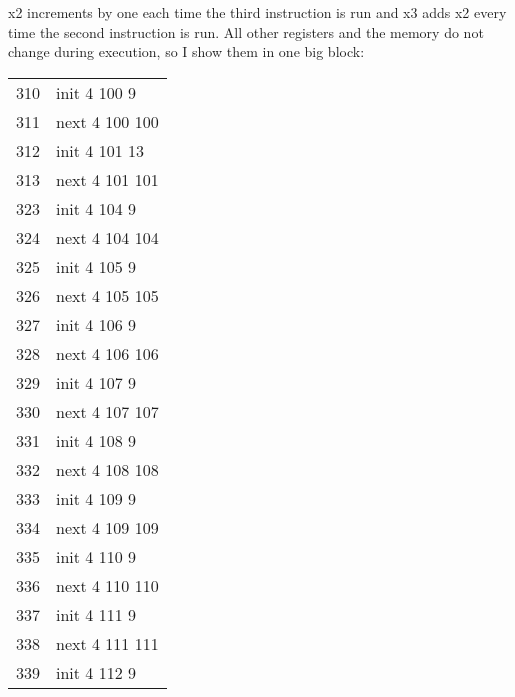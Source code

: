 x2 increments by one each time the third instruction is run and x3
adds x2 every time the second instruction is run. All other registers
and the memory do not change during execution, so I show them in one
big block:
\begin{center}
    \begin{tabular}[h!]{>{\ttfamily\color{UniRed}}r >{\ttfamily}l }
        310 & init \color{UniGrey} 4 \color{UniRed} 100 9   \\
        311 & next \color{UniGrey} 4 \color{UniRed} 100 100 \\
        312 & init \color{UniGrey} 4 \color{UniRed} 101 13  \\
        313 & next \color{UniGrey} 4 \color{UniRed} 101 101 \\
        323 & init \color{UniGrey} 4 \color{UniRed} 104 9   \\
        324 & next \color{UniGrey} 4 \color{UniRed} 104 104 \\
        325 & init \color{UniGrey} 4 \color{UniRed} 105 9   \\
        326 & next \color{UniGrey} 4 \color{UniRed} 105 105 \\
        327 & init \color{UniGrey} 4 \color{UniRed} 106 9   \\
        328 & next \color{UniGrey} 4 \color{UniRed} 106 106 \\
        329 & init \color{UniGrey} 4 \color{UniRed} 107 9   \\
        330 & next \color{UniGrey} 4 \color{UniRed} 107 107 \\
        331 & init \color{UniGrey} 4 \color{UniRed} 108 9   \\
        332 & next \color{UniGrey} 4 \color{UniRed} 108 108 \\
        333 & init \color{UniGrey} 4 \color{UniRed} 109 9   \\
        334 & next \color{UniGrey} 4 \color{UniRed} 109 109 \\
        335 & init \color{UniGrey} 4 \color{UniRed} 110 9   \\
        336 & next \color{UniGrey} 4 \color{UniRed} 110 110 \\
        337 & init \color{UniGrey} 4 \color{UniRed} 111 9   \\
        338 & next \color{UniGrey} 4 \color{UniRed} 111 111 \\
        339 & init \color{UniGrey} 4 \color{UniRed} 112 9   \\
    \end{tabular}\quad

\end{center}
